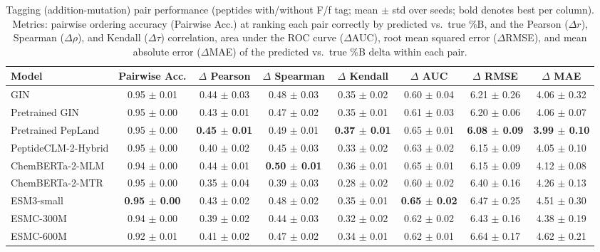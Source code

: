 \begin{table}[htbp]
  \caption{Tagging (addition-mutation) pair performance (peptides with/without F/f tag; mean $\pm$ std over seeds; bold denotes best per column). Metrics: pairwise ordering accuracy (Pairwise Acc.) at ranking each pair correctly by predicted vs.\ true \%B, and the Pearson ($\Delta r$), Spearman ($\Delta\rho$), and Kendall ($\Delta\tau$) correlation, area under the ROC curve ($\Delta$AUC), root mean squared error ($\Delta$RMSE), and mean absolute error ($\Delta$MAE) of the predicted vs.\ true \%B delta within each pair.}
  \label{tab:tagging_performance}
  \centering
  \scriptsize
  \setlength{\tabcolsep}{6pt}
  \begin{tabular}{lccccccc}
    \toprule
    \textbf{Model} & \textbf{Pairwise Acc.} & \textbf{$\Delta$ Pearson} & \textbf{$\Delta$ Spearman} & \textbf{$\Delta$ Kendall} & \textbf{$\Delta$ AUC} & \textbf{$\Delta$ RMSE} & \textbf{$\Delta$ MAE} \\
    \midrule
    GIN & 0.95 $\pm$ 0.01 & 0.44 $\pm$ 0.03 & 0.48 $\pm$ 0.03 & 0.35 $\pm$ 0.02 & 0.60 $\pm$ 0.04 & 6.21 $\pm$ 0.26 & 4.06 $\pm$ 0.32 \\
    Pretrained GIN & 0.95 $\pm$ 0.00 & 0.43 $\pm$ 0.01 & 0.47 $\pm$ 0.02 & 0.35 $\pm$ 0.01 & 0.61 $\pm$ 0.03 & 6.20 $\pm$ 0.06 & 4.06 $\pm$ 0.07 \\
    Pretrained PepLand & 0.95 $\pm$ 0.00 & \textbf{0.45 $\pm$ 0.01} & 0.49 $\pm$ 0.01 & \textbf{0.37 $\pm$ 0.01} & 0.65 $\pm$ 0.01 & \textbf{6.08 $\pm$ 0.09} & \textbf{3.99 $\pm$ 0.10} \\
    PeptideCLM-2-Hybrid & 0.95 $\pm$ 0.00 & 0.40 $\pm$ 0.02 & 0.45 $\pm$ 0.03 & 0.33 $\pm$ 0.02 & 0.63 $\pm$ 0.02 & 6.15 $\pm$ 0.09 & 4.05 $\pm$ 0.10 \\
    ChemBERTa-2-MLM & 0.94 $\pm$ 0.00 & 0.44 $\pm$ 0.01 & \textbf{0.50 $\pm$ 0.01} & 0.36 $\pm$ 0.01 & 0.65 $\pm$ 0.01 & 6.15 $\pm$ 0.09 & 4.12 $\pm$ 0.08 \\
    ChemBERTa-2-MTR & 0.95 $\pm$ 0.00 & 0.35 $\pm$ 0.04 & 0.39 $\pm$ 0.03 & 0.28 $\pm$ 0.02 & 0.60 $\pm$ 0.02 & 6.40 $\pm$ 0.16 & 4.26 $\pm$ 0.13 \\
    ESM3-small & \textbf{0.95 $\pm$ 0.00} & 0.43 $\pm$ 0.02 & 0.48 $\pm$ 0.02 & 0.35 $\pm$ 0.01 & \textbf{0.65 $\pm$ 0.02} & 6.47 $\pm$ 0.25 & 4.51 $\pm$ 0.30 \\
    ESMC-300M & 0.94 $\pm$ 0.00 & 0.39 $\pm$ 0.02 & 0.44 $\pm$ 0.03 & 0.32 $\pm$ 0.02 & 0.62 $\pm$ 0.02 & 6.43 $\pm$ 0.16 & 4.38 $\pm$ 0.19 \\
    ESMC-600M & 0.92 $\pm$ 0.01 & 0.41 $\pm$ 0.02 & 0.47 $\pm$ 0.02 & 0.34 $\pm$ 0.01 & 0.62 $\pm$ 0.01 & 6.64 $\pm$ 0.17 & 4.62 $\pm$ 0.21 \\

\end{tabular}
\end{table}

